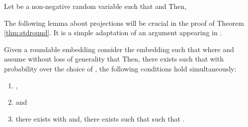 \documentclass[twoside,leqno,twocolumn]{article}
\numberwithin{equation}{section}
\begin{document}
\begin{fact}\label{fct:antimarkov}
Let  be a non-negative random variable such that   and  Then,   
  
\end{fact}





The following lemma about projections will be crucial in the proof of Theorem \ref{thm:stdround}. It is a simple adaptation of an argument appearing in \cite{ARV}.
\begin{lemma}[Projection]\label{lem:projection}
Given a roundable embedding   consider the embedding  such that  where  and assume without loss of generality that     Then, there exists   such that with  probability  over the choice of , the following conditions hold simultaneously:
\begin{enumerate}
\item ,
\item  and 
\item there exists  with  and, there exists  such that  such that .
\end{enumerate}
\end{lemma}
\end{document}
